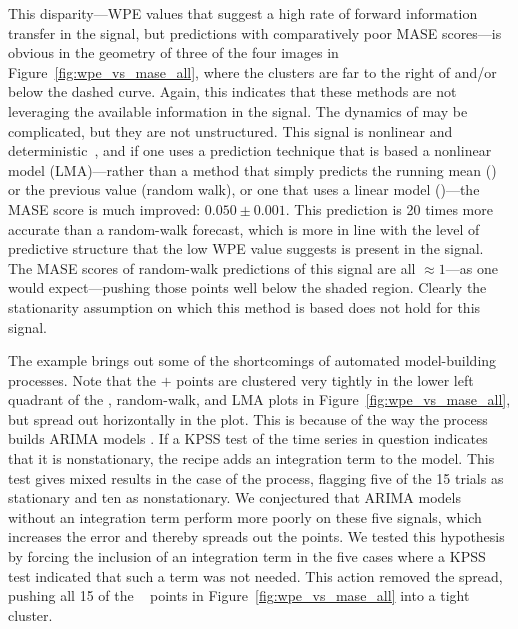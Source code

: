 This disparity---WPE values that suggest a high rate of forward
information transfer in the signal, but predictions with comparatively
poor MASE scores---is obvious in the geometry of three of the four
images in Figure~\ref{fig:wpe_vs_mase_all}, where the \col clusters
are far to the right of and/or below the dashed curve.  Again, this
indicates that these methods are not leveraging the available
information in the signal.  The dynamics of \col may be complicated,
but they are not unstructured.  This signal is nonlinear and
deterministic~\cite{mytkowicz09}, and if one uses a prediction
technique that is based a nonlinear model (LMA)---rather than a method
that simply predicts the running mean (\naive) or the previous value
(random walk), or one that uses a linear model (\arima)---the MASE
score is much improved: $0.050 \pm 0.001$.  This prediction is 20
times more accurate than a random-walk forecast, which is more in line
with the level of predictive structure that the low WPE value suggests
is present in the \col signal.  The MASE scores of random-walk
predictions of this signal are all $\approx 1$---as one would
expect---pushing those points well below the shaded region.  Clearly
the stationarity assumption on which this method is based does not
hold for this signal.

The \col example brings out some of the shortcomings of automated
model-building processes.  Note that the {\color{blue}$+$} points are
clustered very tightly in the lower left quadrant of the \naive,
random-walk, and LMA plots in Figure~\ref{fig:wpe_vs_mase_all}, but
spread out horizontally in the \arima plot.  This is because of the
way the \arima process builds ARIMA models \cite{autoARIMA}.  If a
KPSS test of the time series in question indicates that it is
nonstationary, the \arima recipe adds an integration term to the
model.  This test gives mixed results in the case of the \col process,
flagging five of the 15 trials as stationary and ten as nonstationary.
We conjectured that ARIMA models without an integration term perform
more poorly on these five signals, which increases the error and
thereby spreads out the points.  We tested this hypothesis by forcing
the inclusion of an integration term in the five cases where a KPSS
test indicated that such a term was not needed.  This action removed
the spread, pushing all 15 of the \col ~ \arima points in
Figure~\ref{fig:wpe_vs_mase_all} into a tight cluster.

